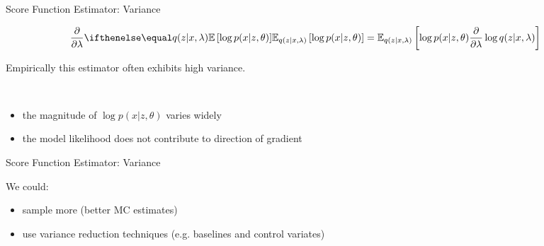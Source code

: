
\begin{frame}{Score Function Estimator: Variance}
\begin{small}
\begin{equation*}
\begin{aligned}
&\pdv{\lambda}\E[q(z|x,\lambda)]{\log p(x|z,\theta)}
= \mathbb E_{q(z|x,\lambda)} \left[  \log p(x|z,\theta)  \pdv{\lambda}\log q(z|x,\lambda)\right]
\end{aligned}
\end{equation*}
\end{small}

\pause

Empirically this estimator often exhibits high variance.

~

\pause 

\begin{itemize}
	\item the magnitude of $\log p(x|z, \theta)$ varies widely \pause 
	\item the model likelihood does not contribute to direction of gradient 
\end{itemize}
\end{frame}


\begin{frame}{Score Function Estimator: Variance}

We could:

\pause

\begin{itemize}
	\item sample more (better MC estimates) \\ \pause
	\item use variance reduction techniques (e.g. baselines and control variates)\\ 
\end{itemize}
\end{frame}

